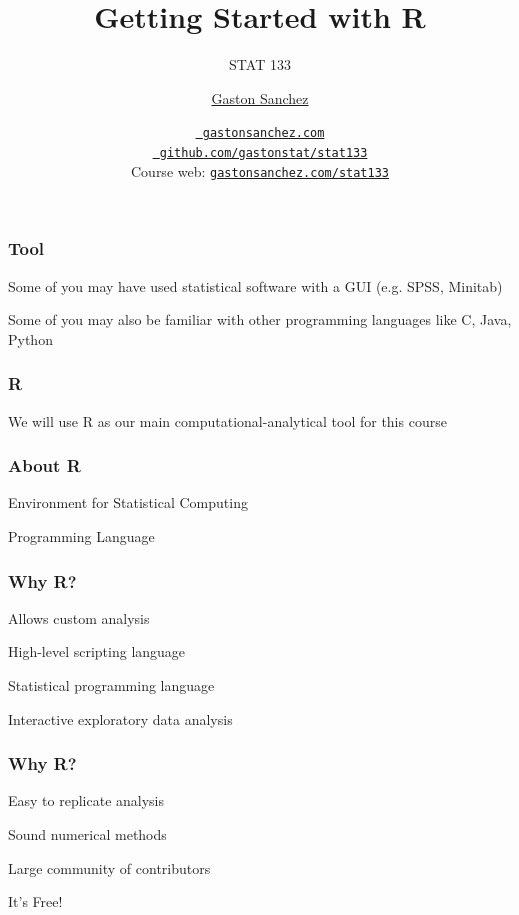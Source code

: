 \documentclass[12pt]{beamer}\usepackage[]{graphicx}\usepackage[]{color}
\title{Getting Started with R}
\subtitle{STAT 133}
\author{\href{http://www.gastonsanchez.com}{Gaston Sanchez}}
\institute{Department of Statistics, UC{\textendash}Berkeley}
\date{\href{http://www.gastonsanchez.com}{\tt \scriptsize \color{foreground} gastonsanchez.com}
\\[-4pt]
\href{http://github.com/gastonstat/stat133}{\tt \scriptsize \color{foreground} github.com/gastonstat/stat133}
\\[-4pt]
{\scriptsize Course web: \href{http://www.gastonsanchez.com/stat133}{\tt gastonsanchez.com/stat133}}
}
\begin{document}
{
  \frame{
    \titlepage
  } 
}


\begin{frame}
\frametitle{Tool}

\bbi
  \item Some of you may have used statistical software with a GUI (e.g. SPSS, Minitab)
  \item Some of you may also be familiar with other programming languages like C, Java, Python
\ei

\end{frame}


\begin{frame}
\frametitle{R}

\Large We will use R as our main computational-analytical tool for this course

\end{frame}


\begin{frame}
\frametitle{About R}

\bbi
  \item Environment for Statistical Computing
  \item Programming Language
\ei
\eb

\end{frame}


\begin{frame}
\frametitle{Why R?}

\bbi
  \item Allows custom analysis
  \item High-level scripting language
  \item Statistical programming language
  \item Interactive exploratory data analysis
\ei

\end{frame}


\begin{frame}
\frametitle{Why R?}

\bbi
  \item Easy to replicate analysis
  \item Sound numerical methods
  \item Large community of contributors
  \item It's Free!
\ei

\end{frame}
\end{document}
